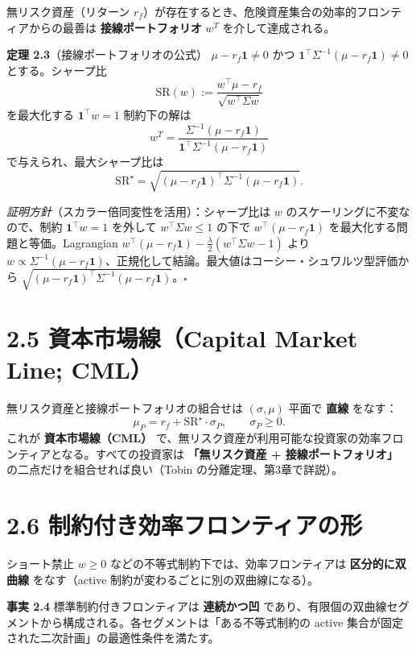 \documentclass[11pt,a4paper]{report}
\begin{document}
無リスク資産（リターン $r_f$）が存在するとき、危険資産集合の効率的フロンティアからの最善は \textbf{接線ポートフォリオ} $w^T$ を介して達成される。

\textbf{定理 2.3}（接線ポートフォリオの公式） $\mu - r_f \mathbf{1} \neq 0$ かつ $\mathbf{1}^\top \Sigma^{-1}(\mu - r_f \mathbf{1}) \neq 0$ とする。シャープ比 \[ \mathrm{SR}(w) := \frac{w^\top \mu - r_f}{\sqrt{w^\top \Sigma w}} \] を最大化する $\mathbf{1}^\top w = 1$ 制約下の解は \[ \boxed{\; w^T = \frac{\Sigma^{-1}(\mu - r_f \mathbf{1})}{\mathbf{1}^\top \Sigma^{-1}(\mu - r_f \mathbf{1})} \;} \] で与えられ、最大シャープ比は \[ \mathrm{SR}^\star = \sqrt{(\mu - r_f\mathbf{1})^\top \Sigma^{-1} (\mu - r_f\mathbf{1})}. \]

\emph{証明方針}（スカラー倍同変性を活用）：シャープ比は $w$ のスケーリングに不変なので、制約 $\mathbf{1}^\top w = 1$ を外して $w^\top\Sigma w \le 1$ の下で $w^\top(\mu - r_f \mathbf{1})$ を最大化する問題と等価。Lagrangian $w^\top(\mu - r_f\mathbf{1}) - \tfrac{\lambda}{2}(w^\top \Sigma w - 1)$ より $w \propto \Sigma^{-1}(\mu - r_f\mathbf{1})$、正規化して結論。最大値はコーシー・シュワルツ型評価から $\sqrt{(\mu-r_f\mathbf{1})^\top \Sigma^{-1}(\mu-r_f\mathbf{1})}$。$\square$

\section{2.5 資本市場線（Capital Market Line; CML）}

無リスク資産と接線ポートフォリオの組合せは $(\sigma, \mu)$ 平面で \textbf{直線} をなす： \[ \mu_P = r_f + \mathrm{SR}^\star \cdot \sigma_P, \qquad \sigma_P \ge 0. \] これが \textbf{資本市場線（CML）} で、無リスク資産が利用可能な投資家の効率フロンティアとなる。すべての投資家は \textbf{「無リスク資産 + 接線ポートフォリオ」} の二点だけを組合せれば良い（Tobin の分離定理、第3章で詳説）。

\section{2.6 制約付き効率フロンティアの形}

ショート禁止 $w \ge 0$ などの不等式制約下では、効率フロンティアは \textbf{区分的に双曲線} をなす（active 制約が変わるごとに別の双曲線になる）。

\textbf{事実 2.4} 標準制約付きフロンティアは \textbf{連続かつ凹} であり、有限個の双曲線セグメントから構成される。各セグメントは「ある不等式制約の active 集合が固定された二次計画」の最適性条件を満たす。
\end{document}
